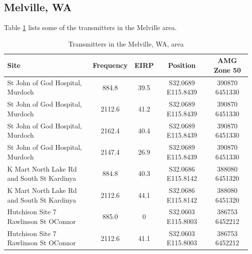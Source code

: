 \documentclass[a4paper]{report}
\numberwithin{equation}{chapter}
\begin{document}
\subsection[Melville, WA]{Melville, WA}

Table \ref{tab:03} lists some of the transmitters in the Melville area.

\begin{table}
\begin{center}
\begin{tabular}{|p{3.5cm}|c|c|c|c|}
\hline
Site & Frequency & EIRP & Position & AMG Zone 50 \\ \hline \hline
St John of God Hospital, Murdoch & 884.8 & 39.5 & S32.0689 E115.8439 & 390870 6451330 \\ \hline
St John of God Hospital, Murdoch & 2112.6 & 41.2 & S32.0689 E115.8439 & 390870 6451330 \\ \hline
St John of God Hospital, Murdoch & 2162.4 & 40.4 & S32.0689 E115.8439 & 390870 6451330 \\ \hline
St John of God Hospital, Murdoch & 2147.4 & 26.9 & S32.0689 E115.8439 & 390870 6451330 \\ \hline
K Mart North Lake Rd and South St Kardinya & 884.8 & 40.3 & S32.0686 E115.8142 & 388080 6451320 \\ \hline
K Mart North Lake Rd and South St Kardinya & 2112.6 & 44.1 & S32.0686 E115.8142 & 388080 6451320 \\ \hline
Hutchison Site 7 Rawlinson St OConnor & 885.0 & 0 & S32.0603 E115.8003 & 386753 6452212 \\ \hline
Hutchison Site 7 Rawlinson St OConnor & 2112.6 & 41.1 & S32.0603 E115.8003 & 386753 6452212 \\ \hline
\end{tabular}
\caption{Transmitters in the Melville, WA, area}
\label{tab:03}
\end{center}
\end{table}
\end{document}
